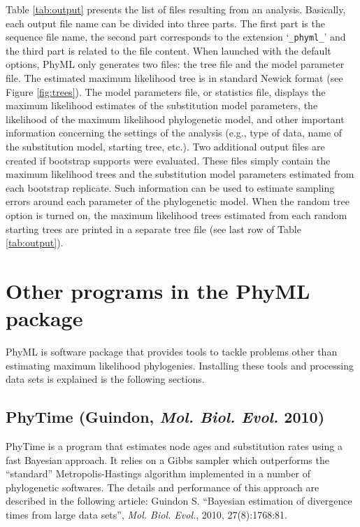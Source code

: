 \documentclass[a4paper,12pt]{article}
\newcommand{\x}[1]{\texttt{#1}}
\begin{document}
Table  \ref{tab:output} presents  the list  of files  resulting from  an analysis.   Basically, each
output file  name can be divided into  three parts.  The first  part is the sequence  file name, the
second part corresponds to  the extension `\x{\_phyml\_}' and the third part  is related to the file
content.  When launched with the default options,  PhyML only generates two files: the tree file and
the model parameter file.   The estimated maximum likelihood tree is in  standard Newick format (see
Figure  \ref{fig:trees}).  The  model  parameters file,  or  statistics file,  displays the  maximum
likelihood estimates of the substitution model  parameters, the likelihood of the maximum likelihood
phylogenetic model, and  other important information concerning the settings  of the analysis (e.g.,
type of data, name of the substitution model, starting tree, etc.).  Two additional output files are
created if  bootstrap supports were  evaluated.  These files  simply contain the  maximum likelihood
trees  and  the  substitution  model  parameters  estimated from  each  bootstrap  replicate.   Such
information can be used to estimate sampling errors around each parameter of the phylogenetic model.
When the random  tree option is turned on,  the maximum likelihood trees estimated  from each random
starting trees are printed in a separate tree file (see last row of Table \ref{tab:output}).



\section{Other programs in the PhyML package}

PhyML  is software package  that provides  tools to  tackle problems  other than  estimating maximum
likelihood  phylogenies.  Installing these  tools  and  processing data  sets  is  explained is  the
following sections.

\subsection{PhyTime (Guindon, {\it Mol. Biol. Evol.} 2010)} PhyTime is a program that
estimates node  ages and substitution rates  using a fast Bayesian  approach.  It relies  on a Gibbs
sampler which outperforms the ``standard''  Metropolis-Hastings algorithm implemented in a number of
phylogenetic softwares.  The details and performance of this approach are described in the following
article:  Guindon  S.   ``Bayesian  estimation  of  divergence times  from  large  data  sets'',  {\it
Mol. Biol. Evol.}, 2010, 27(8):1768:81.
\end{document}
